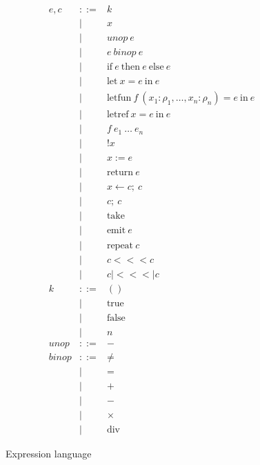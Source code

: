 \documentclass[twocolumn]{article}
\newcommand{\bnfdef}{::=}
\newcommand{\bnfalt}{\mathrel{\mid}}
\newcommand{\kw}[1]{\mbox{#1}}
\newcommand{\arr}{\mathrel{<\!\!<\!\!<}}
\newcommand{\parr}{\mathrel{|\!\!<\!\!<\!\!<\!\!|}}
\begin{document}
\begin{figure}
\begin{equation*}
\begin{array}{lcl}
  e, c
     & \bnfdef & k \\
     & \bnfalt & x \\
     & \bnfalt & unop~ e \\
     & \bnfalt & e~ binop~ e \\
     & \bnfalt & \kw{if}~ e~ \kw{then}~ e~ \kw{else}~ e \\
     & \bnfalt & \kw{let}~ x \mathrel{=} e~ \kw{in}~ e \\
     & \bnfalt & \kw{letfun}~ f~ (x_1 : \rho_1, \ldots, x_n : \rho_n) \mathrel{=} e~ \kw{in}~ e \\
     & \bnfalt & \kw{letref}~ x \mathrel{=} e~ \kw{in}~ e \\
     & \bnfalt & f~ e_1~ \ldots~ e_n \\
     & \bnfalt & \kw{!} x \\
     & \bnfalt & x \mathrel{:=} e \\
     & \bnfalt & \kw{return}~ e \\
     & \bnfalt & x \mathrel{\leftarrow} c;~ c \\
     & \bnfalt & c;~ c \\
     & \bnfalt & \kw{take} \\
     & \bnfalt & \kw{emit}~ e \\
     & \bnfalt & \kw{repeat}~ c \\
     & \bnfalt & c \arr c \\
     & \bnfalt & c \parr c \\
  k
     & \bnfdef & () \\
     & \bnfalt & \kw{true} \\
     & \bnfalt & \kw{false} \\
     & \bnfalt & n \\
  unop
     & \bnfdef & - \\
  binop
     & \bnfdef & \ne \\
     & \bnfalt & = \\
     & \bnfalt & + \\
     & \bnfalt & - \\
     & \bnfalt & \times \\
     & \bnfalt & \kw{div}
\end{array}
\end{equation*}
\caption{Expression language}
\label{fig:lang:exp}
\end{figure}
\end{document}
